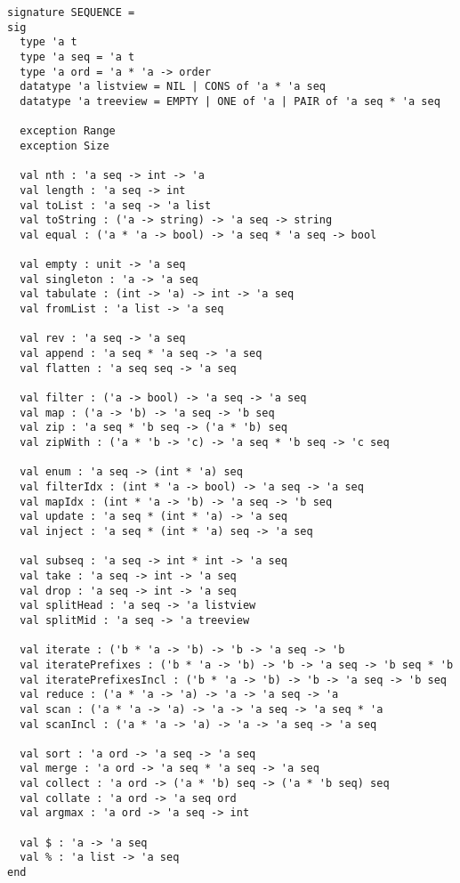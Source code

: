 \begin{gram}
\begin{verbatim}
signature SEQUENCE =
sig
  type 'a t
  type 'a seq = 'a t
  type 'a ord = 'a * 'a -> order
  datatype 'a listview = NIL | CONS of 'a * 'a seq
  datatype 'a treeview = EMPTY | ONE of 'a | PAIR of 'a seq * 'a seq

  exception Range
  exception Size

  val nth : 'a seq -> int -> 'a
  val length : 'a seq -> int
  val toList : 'a seq -> 'a list
  val toString : ('a -> string) -> 'a seq -> string
  val equal : ('a * 'a -> bool) -> 'a seq * 'a seq -> bool

  val empty : unit -> 'a seq
  val singleton : 'a -> 'a seq
  val tabulate : (int -> 'a) -> int -> 'a seq
  val fromList : 'a list -> 'a seq

  val rev : 'a seq -> 'a seq
  val append : 'a seq * 'a seq -> 'a seq
  val flatten : 'a seq seq -> 'a seq

  val filter : ('a -> bool) -> 'a seq -> 'a seq
  val map : ('a -> 'b) -> 'a seq -> 'b seq
  val zip : 'a seq * 'b seq -> ('a * 'b) seq
  val zipWith : ('a * 'b -> 'c) -> 'a seq * 'b seq -> 'c seq

  val enum : 'a seq -> (int * 'a) seq
  val filterIdx : (int * 'a -> bool) -> 'a seq -> 'a seq
  val mapIdx : (int * 'a -> 'b) -> 'a seq -> 'b seq
  val update : 'a seq * (int * 'a) -> 'a seq
  val inject : 'a seq * (int * 'a) seq -> 'a seq

  val subseq : 'a seq -> int * int -> 'a seq
  val take : 'a seq -> int -> 'a seq
  val drop : 'a seq -> int -> 'a seq
  val splitHead : 'a seq -> 'a listview
  val splitMid : 'a seq -> 'a treeview

  val iterate : ('b * 'a -> 'b) -> 'b -> 'a seq -> 'b
  val iteratePrefixes : ('b * 'a -> 'b) -> 'b -> 'a seq -> 'b seq * 'b
  val iteratePrefixesIncl : ('b * 'a -> 'b) -> 'b -> 'a seq -> 'b seq
  val reduce : ('a * 'a -> 'a) -> 'a -> 'a seq -> 'a
  val scan : ('a * 'a -> 'a) -> 'a -> 'a seq -> 'a seq * 'a
  val scanIncl : ('a * 'a -> 'a) -> 'a -> 'a seq -> 'a seq

  val sort : 'a ord -> 'a seq -> 'a seq
  val merge : 'a ord -> 'a seq * 'a seq -> 'a seq
  val collect : 'a ord -> ('a * 'b) seq -> ('a * 'b seq) seq
  val collate : 'a ord -> 'a seq ord
  val argmax : 'a ord -> 'a seq -> int

  val $ : 'a -> 'a seq
  val % : 'a list -> 'a seq
end
\end{verbatim}
\end{gram}

